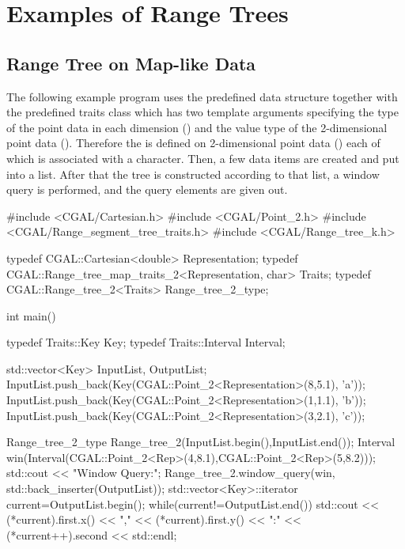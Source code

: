 \section{Examples of Range Trees}
\label{User:RangeSegment:User:Range}
\subsection{Range Tree on Map-like Data}

The following example program uses the predefined  data structure together with the predefined traits
  class  which has two template
  arguments specifying the
  type of the point data in each dimension
  () and the value type of the
  2-dimensional point data (). Therefore the  is defined on 2-dimensional point data
  () each of which is
  associated with a character.
Then, a few data items are created and put into a list. After
  that the tree is constructed according to that list, a window
  query is performed, and the query elements are given out.

\begin{cprog}

#include <CGAL/Cartesian.h>
#include <CGAL/Point_2.h>
#include <CGAL/Range_segment_tree_traits.h>
#include <CGAL/Range_tree_k.h>

typedef CGAL::Cartesian<double> Representation;
typedef CGAL::Range_tree_map_traits_2<Representation, char> Traits;
typedef CGAL::Range_tree_2<Traits> Range_tree_2_type;

int main()
{
  typedef Traits::Key Key;                
  typedef Traits::Interval Interval;    

  std::vector<Key> InputList, OutputList;
  InputList.push_back(Key(CGAL::Point_2<Representation>(8,5.1), 'a'));
  InputList.push_back(Key(CGAL::Point_2<Representation>(1,1.1), 'b'));
  InputList.push_back(Key(CGAL::Point_2<Representation>(3,2.1), 'c'));

  Range_tree_2_type Range_tree_2(InputList.begin(),InputList.end());
  Interval win(Interval(CGAL::Point_2<Rep>(4,8.1),CGAL::Point_2<Rep>(5,8.2)));
  std::cout << "\n Window Query:\n ";
  Range_tree_2.window_query(win, std::back_inserter(OutputList));
  std::vector<Key>::iterator current=OutputList.begin();
  while(current!=OutputList.end()){
    std::cout << (*current).first.x() << "," << (*current).first.y()
         << ":" << (*current++).second << std::endl;
  }
}
\end{cprog}



